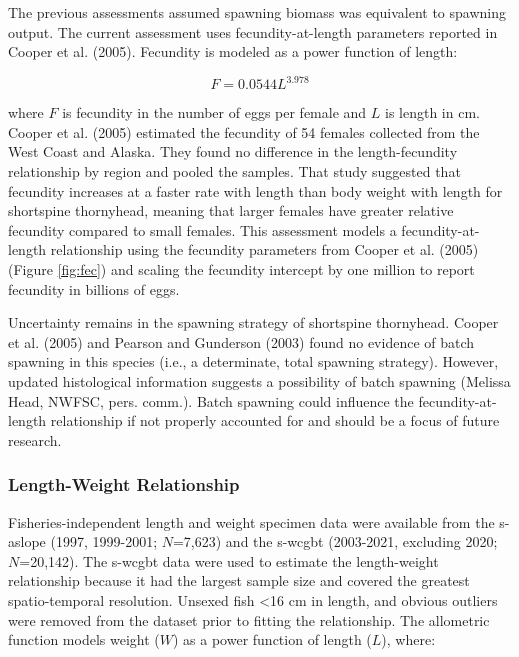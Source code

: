 \documentclass[11pt,
  english,
  letterpaper,
]{article}
\begin{document}
The previous assessments assumed spawning biomass was equivalent to spawning output. The current assessment uses fecundity-at-length parameters reported in Cooper et al. (2005). Fecundity is modeled as a power function of length:

\begin{equation} F = 0.0544L^{3.978} \end{equation}

where \(F\) is fecundity in the number of eggs per female and \(L\) is length in cm. Cooper et al. (2005) estimated the fecundity of 54 females collected from the West Coast and Alaska. They found no difference in the length-fecundity relationship by region and pooled the samples. That study suggested that fecundity increases at a faster rate with length than body weight with length for shortspine thornyhead, meaning that larger females have greater relative fecundity compared to small females. This assessment models a fecundity-at-length relationship using the fecundity parameters from Cooper et al. (2005) (Figure \ref{fig:fec}) and scaling the fecundity intercept by one million to report fecundity in billions of eggs.

Uncertainty remains in the spawning strategy of shortspine thornyhead. Cooper et al. (2005) and Pearson and Gunderson (2003) found no evidence of batch spawning in this species (i.e., a determinate, total spawning strategy). However, updated histological information suggests a possibility of batch spawning (Melissa Head, NWFSC, pers. comm.). Batch spawning could influence the fecundity-at-length relationship if not properly accounted for and should be a focus of future research.

\hypertarget{length-weight-relationship}{%
\subsubsection{Length-Weight Relationship}\label{length-weight-relationship}}

Fisheries-independent length and weight specimen data were available from the \gls{s-aslope} (1997, 1999-2001; \(N\)=7,623) and the \gls{s-wcgbt} (2003-2021, excluding 2020; \(N\)=20,142). The \gls{s-wcgbt} data were used to estimate the length-weight relationship because it had the largest sample size and covered the greatest spatio-temporal resolution. Unsexed fish \textless16 cm in length, and obvious outliers were removed from the dataset prior to fitting the relationship. The allometric function models weight (\(W\)) as a power function of length (\(L\)), where:
\end{document}
